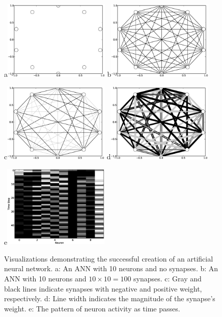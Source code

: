 \documentclass[12pt]{article}
\begin{document}
\begin{figure}[!t]
\centerline{
a\includegraphics[width=0.45\textwidth]{Fig1.eps}
b\includegraphics[width=0.45\textwidth]{Fig2.eps}
}
\centerline{
c\includegraphics[width=0.45\textwidth]{Fig3.eps}
d\includegraphics[width=0.45\textwidth]{Fig4.eps}
}
\centerline{
e\includegraphics[width=0.45\textwidth]{Fig5.eps}
}
\caption{Visualizations demonstrating the successful creation of an artificial neural network.
a: An ANN with 10 neurons and no synapses.
b: An ANN with 10 neurons and $10 \times 10 = 100$ synapses.
c: Gray and black lines indicate synapses with negative and positive weight, respectively.
d: Line width indicates the magnitude of the synapse's weight.
e: The pattern of neuron activity as time passes.}
\label{Fig}
\end{figure}
\end{document}
